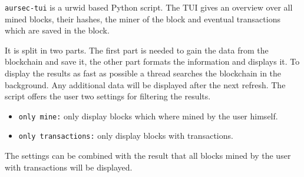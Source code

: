 \label{sec:tui} 
\texttt{aursec-tui} is a urwid based Python script. The TUI gives an overview over all mined blocks, their hashes, the miner of the block and eventual transactions which are saved in the block.

It is split in two parts. The first part is needed to gain the data from the blockchain and save it, the other part formats the information and displays it. To display the results as fast as possible a thread searches the blockchain in the background. Any additional data will be displayed after the next refresh. The script offers the user two settings for filtering the results.
\begin{itemize}
	\item \texttt{only mine:} only display blocks which where mined by the user himself.
	\item \texttt{only transactions:} only display blocks with transactions.
\end{itemize}
The settings can be combined with the result that all blocks mined by the user with transactions will be displayed.
